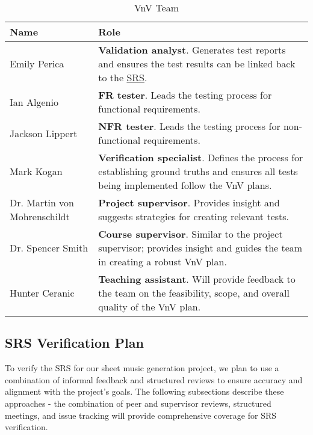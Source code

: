 \documentclass[12pt, titlepage]{article}
\begin{document}
\begin{table}[h!]
  \centering
  \caption{VnV Team}
  \label{table:vnv}
  \vspace{5pt}
  \begin{tabular}{|p{}|p{}|}
  \hline
    \textbf{Name} & \textbf{Role} \\
  \hline
    Emily Perica & \textbf{Validation analyst}. Generates test reports and ensures the test results can be 
    linked back to the \href{https://github.com/emilyperica/ScoreGen/blob/main/docs/SRS-Volere/SRS.pdf}{SRS}.\\
  \hline
    Ian Algenio & \textbf{FR tester}. Leads the testing process for functional requirements. \\
  \hline
    Jackson Lippert & \textbf{NFR tester}. Leads the testing process for non-functional requirements. \\
  \hline
    Mark Kogan & \textbf{Verification specialist}. Defines the process for establishing ground truths and 
    ensures all tests being implemented follow the VnV plans. \\
  \hline
    Dr. Martin von \newline Mohrenschildt & \textbf{Project supervisor}. Provides insight and suggests 
    strategies for creating relevant tests. \\
  \hline
    Dr. Spencer Smith & \textbf{Course supervisor}. Similar to the project supervisor; provides insight and 
    guides the team in creating a robust VnV plan.\\
  \hline
    Hunter Ceranic & \textbf{Teaching assistant}. Will provide feedback to the team on the feasibility, scope, 
    and overall quality of the VnV plan.\\
  \hline
  \end{tabular}
\end{table}

\subsection{SRS Verification Plan}
\label{sec:srs_verification}

To verify the SRS for our sheet music generation project, we plan to use a combination of informal feedback and 
structured reviews to ensure accuracy and alignment with the project's goals. The following subsections describe 
these approaches - the combination of peer and supervisor reviews, structured meetings, and issue tracking will 
provide comprehensive coverage for SRS verification.
\end{document}
